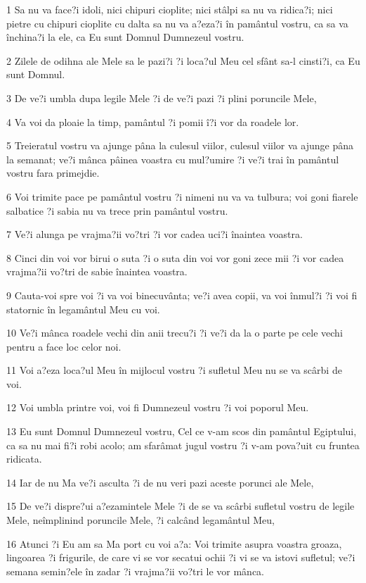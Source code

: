 \par 1 Sa nu va face?i idoli, nici chipuri cioplite; nici stâlpi sa nu va ridica?i; nici pietre cu chipuri cioplite cu dalta sa nu va a?eza?i în pamântul vostru, ca sa va închina?i la ele, ca Eu sunt Domnul Dumnezeul vostru.
\par 2 Zilele de odihna ale Mele sa le pazi?i ?i loca?ul Meu cel sfânt sa-l cinsti?i, ca Eu sunt Domnul.
\par 3 De ve?i umbla dupa legile Mele ?i de ve?i pazi ?i plini poruncile Mele,
\par 4 Va voi da ploaie la timp, pamântul ?i pomii î?i vor da roadele lor.
\par 5 Treieratul vostru va ajunge pâna la culesul viilor, culesul viilor va ajunge pâna la semanat; ve?i mânca pâinea voastra cu mul?umire ?i ve?i trai în pamântul vostru fara primejdie.
\par 6 Voi trimite pace pe pamântul vostru ?i nimeni nu va va tulbura; voi goni fiarele salbatice ?i sabia nu va trece prin pamântul vostru.
\par 7 Ve?i alunga pe vrajma?ii vo?tri ?i vor cadea uci?i înaintea voastra.
\par 8 Cinci din voi vor birui o suta ?i o suta din voi vor goni zece mii ?i vor cadea vrajma?ii vo?tri de sabie înaintea voastra.
\par 9 Cauta-voi spre voi ?i va voi binecuvânta; ve?i avea copii, va voi înmul?i ?i voi fi statornic în legamântul Meu cu voi.
\par 10 Ve?i mânca roadele vechi din anii trecu?i ?i ve?i da la o parte pe cele vechi pentru a face loc celor noi.
\par 11 Voi a?eza loca?ul Meu în mijlocul vostru ?i sufletul Meu nu se va scârbi de voi.
\par 12 Voi umbla printre voi, voi fi Dumnezeul vostru ?i voi poporul Meu.
\par 13 Eu sunt Domnul Dumnezeul vostru, Cel ce v-am scos din pamântul Egiptului, ca sa nu mai fi?i robi acolo; am sfarâmat jugul vostru ?i v-am pova?uit cu fruntea ridicata.
\par 14 Iar de nu Ma ve?i asculta ?i de nu veri pazi aceste porunci ale Mele,
\par 15 De ve?i dispre?ui a?ezamintele Mele ?i de se va scârbi sufletul vostru de legile Mele, neîmplinind poruncile Mele, ?i calcând legamântul Meu,
\par 16 Atunci ?i Eu am sa Ma port cu voi a?a: Voi trimite asupra voastra groaza, lingoarea ?i frigurile, de care vi se vor secatui ochii ?i vi se va istovi sufletul; ve?i semana semin?ele în zadar ?i vrajma?ii vo?tri le vor mânca.
